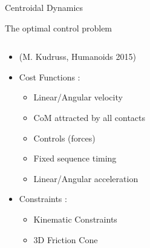 \begin{frame}{Centroidal Dynamics}
\begin{itemize}
\end{itemize}

\end{frame}


\begin{frame}{The optimal control problem}
\vspace*{-0.5cm}
\begin{columns}
\begin{column}{0.5\textwidth}

\begin{itemize}
  \item {(M. Kudruss, Humanoids 2015)}
\end{itemize}

\begin{itemize}
  \item Cost Functions :
  \begin{itemize}
    \item Linear/Angular velocity
    \item \textcolor{blue!70!black}{CoM attracted by all contacts}
    \item Controls (forces)
    \item \textcolor{blue!70!black}{Fixed sequence timing}
    \item Linear/Angular acceleration
  \end{itemize}
  \vspace*{0.5cm}
  \item Constraints :
  \begin{itemize}
    \item \textcolor{blue!70!black}{Kinematic Constraints}
    \item \textcolor{blue!70!black}{3D Friction Cone}
  \end{itemize}
\end{itemize}
%

\end{column}
\end{columns}
\end{frame}
